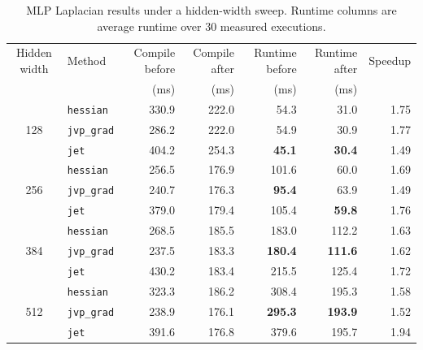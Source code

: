 \documentclass{article}
\theoremstyle{plain}
\theoremstyle{definition}
\theoremstyle{remark}
\begin{document}
\begin{table}[t]
\centering
\caption{MLP Laplacian results under a hidden-width sweep.  Runtime columns are
average runtime over 30 measured executions.}
\label{tab:mlp-laplacian-results}
\begin{tabular}{clrrrrr}
\toprule
Hidden width & Method & Compile before & Compile after & Runtime before
& Runtime after & Speedup \\
 & & (ms) & (ms) & (ms) & (ms) & \\
\midrule
\multirow{3}{*}{128}
& \texttt{hessian} & 330.9 & 222.0 & 54.3 & 31.0 & 1.75 \\
& \texttt{jvp\_grad} & 286.2 & 222.0 & 54.9 & 30.9 & 1.77 \\
& \texttt{jet} & 404.2 & 254.3 & \textbf{45.1} & \textbf{30.4} & 1.49 \\
\midrule
\multirow{3}{*}{256}
& \texttt{hessian} & 256.5 & 176.9 & 101.6 & 60.0 & 1.69 \\
& \texttt{jvp\_grad} & 240.7 & 176.3 & \textbf{95.4} & 63.9 & 1.49 \\
& \texttt{jet} & 379.0 & 179.4 & 105.4 & \textbf{59.8} & 1.76 \\
\midrule
\multirow{3}{*}{384}
& \texttt{hessian} & 268.5 & 185.5 & 183.0 & 112.2 & 1.63 \\
& \texttt{jvp\_grad} & 237.5 & 183.3 & \textbf{180.4} & \textbf{111.6} & 1.62 \\
& \texttt{jet} & 430.2 & 183.4 & 215.5 & 125.4 & 1.72 \\
\midrule
\multirow{3}{*}{512}
& \texttt{hessian} & 323.3 & 186.2 & 308.4 & 195.3 & 1.58 \\
& \texttt{jvp\_grad} & 238.9 & 176.1 & \textbf{295.3} & \textbf{193.9} & 1.52 \\
& \texttt{jet} & 391.6 & 176.8 & 379.6 & 195.7 & 1.94 \\
\bottomrule
\end{tabular}
\end{table}
\end{document}
